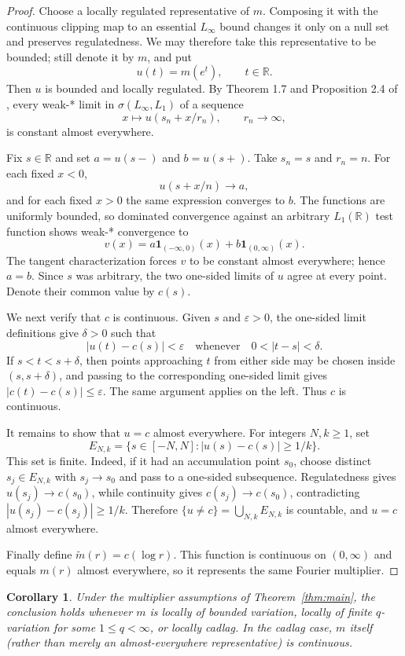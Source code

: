 \documentclass[11pt]{article}
\newtheorem{corollary}[theorem]{Corollary}
\newcommand{\R}{\mathbb{R}}
\begin{document}
\begin{proof}
Choose a locally regulated representative of $m$. Composing it with the
continuous clipping map to an essential $L_\infty$ bound changes it only on a
null set and preserves regulatedness. We may therefore take this
representative to be bounded; still denote it by $m$, and put
\[
  u(t)=m(e^t),\qquad t\in\R.
\]
Then $u$ is bounded and locally regulated. By Theorem 1.7 and Proposition 2.4
of \cite{delasalle2026}, every weak-* limit in $\sigma(L_\infty,L_1)$ of a
sequence
\[
  x\longmapsto u(s_n+x/r_n),\qquad r_n\longrightarrow\infty,
\]
is constant almost everywhere.

Fix $s\in\R$ and set $a=u(s-)$ and $b=u(s+)$. Take $s_n=s$ and $r_n=n$.
For each fixed $x<0$,
\[
  u(s+x/n)\longrightarrow a,
\]
and for each fixed $x>0$ the same expression converges to $b$. The functions
are uniformly bounded, so dominated convergence against an arbitrary
$L_1(\R)$ test function shows weak-* convergence to
\[
  v(x)=a\mathbf 1_{(-\infty,0)}(x)+b\mathbf 1_{(0,\infty)}(x).
\]
The tangent characterization forces $v$ to be constant almost everywhere;
hence $a=b$. Since $s$ was arbitrary, the two one-sided limits of $u$ agree at
every point. Denote their common value by $c(s)$.

We next verify that $c$ is continuous. Given $s$ and $\varepsilon>0$, the
one-sided limit definitions give $\delta>0$ such that
\[
  |u(t)-c(s)|<\varepsilon
  \quad\text{whenever}\quad 0<|t-s|<\delta.
\]
If $s<t<s+\delta$, then points approaching $t$ from either side may be chosen
inside $(s,s+\delta)$, and passing to the corresponding one-sided limit gives
$|c(t)-c(s)|\le\varepsilon$. The same argument applies on the left. Thus $c$
is continuous.

It remains to show that $u=c$ almost everywhere. For integers $N,k\ge1$, set
\[
  E_{N,k}=\{s\in[-N,N]: |u(s)-c(s)|\ge 1/k\}.
\]
This set is finite. Indeed, if it had an accumulation point $s_0$, choose
distinct $s_j\in E_{N,k}$ with $s_j\to s_0$ and pass to a one-sided
subsequence. Regulatedness gives $u(s_j)\to c(s_0)$, while continuity gives
$c(s_j)\to c(s_0)$, contradicting
$|u(s_j)-c(s_j)|\ge1/k$. Therefore
$\{u\ne c\}=\bigcup_{N,k}E_{N,k}$ is countable, and $u=c$ almost everywhere.

Finally define $\widetilde m(r)=c(\log r)$. This function is continuous on
$(0,\infty)$ and equals $m(r)$ almost everywhere, so it represents the same
Fourier multiplier.
\end{proof}

\begin{corollary}
Under the multiplier assumptions of Theorem~\ref{thm:main}, the conclusion
holds whenever $m$ is locally of bounded variation, locally of finite
$q$-variation for some $1\le q<\infty$, or locally cadlag. In the cadlag case,
$m$ itself (rather than merely an almost-everywhere representative) is
continuous.
\end{corollary}
\end{document}
